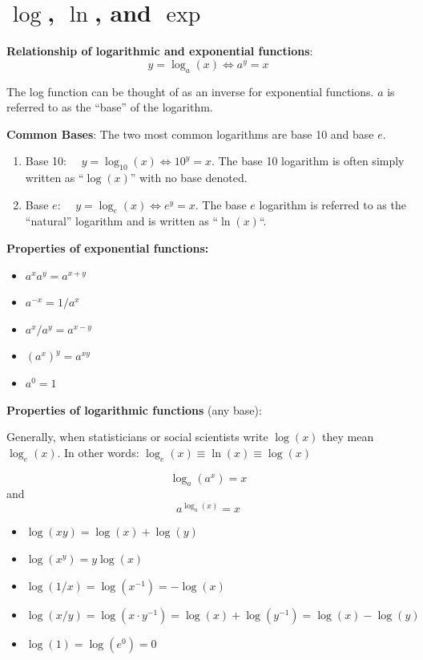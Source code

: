\documentclass[]{book}
\providecommand{\tightlist}{%
  \setlength{\itemsep}{0pt}\setlength{\parskip}{0pt}}
\theoremstyle{definition}
\theoremstyle{definition}
\theoremstyle{definition}
\theoremstyle{remark}
\begin{document}
\section{\texorpdfstring{\(\log\), \(\ln\), and
\(\exp\)}{\textbackslash{}log, \textbackslash{}ln, and \textbackslash{}exp}}\label{log-ln-and-exp}

\textbf{Relationship of logarithmic and exponential functions}:
\[y=\log_a(x) \iff a^y=x\]

The log function can be thought of as an inverse for exponential
functions. \(a\) is referred to as the ``base'' of the logarithm.

\textbf{Common Bases}: The two most common logarithms are base 10 and
base \(e\).

\begin{enumerate}
\def\labelenumi{\arabic{enumi}.}
\tightlist
\item
  Base 10: \(\quad y=\log_{10}(x) \iff 10^y=x\). The base 10 logarithm
  is often simply written as ``\(\log(x)\)'' with no base denoted.
\item
  Base \(e\): \(\quad y=\log_e(x) \iff e^y=x\). The base \(e\) logarithm
  is referred to as the ``natural'' logarithm and is written as
  ``\(\ln(x)\)``.
\end{enumerate}

\textbf{Properties of exponential functions:}

\begin{itemize}
\tightlist
\item
  \(a^x a^y = a^{x+y}\)
\item
  \(a^{-x} = 1/a^x\)
\item
  \(a^x/a^y = a^{x-y}\)
\item
  \((a^x)^y = a^{x y}\)
\item
  \(a^0 = 1\)
\end{itemize}

\textbf{Properties of logarithmic functions} (any base):

Generally, when statisticians or social scientists write \(\log(x)\)
they mean \(\log_e(x)\). In other words:
\(\log_e(x) \equiv \ln(x) \equiv \log(x)\)

\[\log_a(a^x)=x\] and \[a^{\log_a(x)}=x\]

\begin{itemize}
\tightlist
\item
  \(\log(x y)=\log(x)+\log(y)\)
\item
  \(\log(x^y)=y\log(x)\)
\item
  \(\log(1/x)=\log(x^{-1})=-\log(x)\)
\item
  \(\log(x/y)=\log(x\cdot y^{-1})=\log(x)+\log(y^{-1})=\log(x)-\log(y)\)
\item
  \(\log(1)=\log(e^0)=0\)
\end{itemize}
\end{document}
